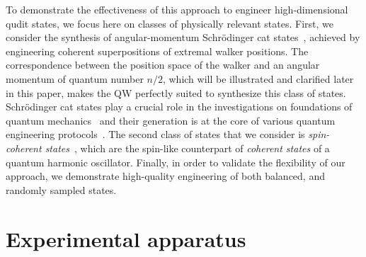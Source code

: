 To demonstrate the effectiveness of this approach to engineer high-dimensional qudit states, we focus here on classes of physically relevant states. First, we consider the synthesis of angular-momentum Schr\"odinger cat states~\cite{militello2006distilling}, achieved by engineering coherent superpositions of extremal walker positions. The correspondence between the position space of the walker and an angular momentum of quantum number $n/2$, which will be illustrated and clarified later in this paper, makes the \ac{QW} perfectly suited to synthesize this class of states. Schr\"odinger cat states play a crucial role in the investigations on foundations of quantum mechanics~\cite{schrodinger1935gegenwartige} and their generation is at the core of various quantum engineering protocols~\cite{brune1992manipulation, monroe1996schrodinger,agarwal1997atomic, zhang2016creating}. The second class of states that we consider is \emph{spin-coherent states}~\cite{ulyanov1999spin}, which are the spin-like counterpart of \emph{coherent states} of a quantum harmonic oscillator. Finally, in order to validate the flexibility of our approach, we demonstrate high-quality engineering of both balanced, and randomly sampled states.

\section{Experimental apparatus}
\label{sec:expQWs:experimental_apparatus}

